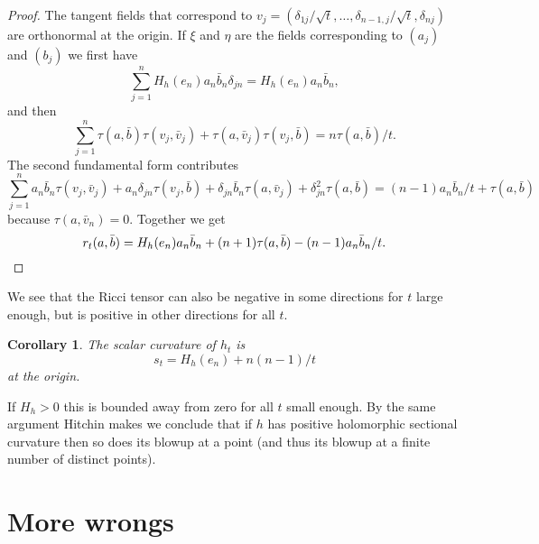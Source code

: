 \documentclass[10pt,a4paper]{amsart}
\newtheorem{coro}[theo]{Corollary}
\def\hsc{holomorphic sectional curvature}
\begin{document}
\begin{proof}
The tangent fields that correspond to
$v_j = (\delta_{1j}/\sqrt t, \ldots, \delta_{n-1,j}/\sqrt t, \delta_{nj})$ are
orthonormal at the origin.
If $\xi$ and $\eta$ are the fields corresponding to $(a_j)$ and $(b_j)$ we
first have
$$
\sum_{j=1}^n H_h(e_n) a_n \bar b_n \delta_{jn} = H_h(e_n) a_n \bar b_n,
$$
and then
$$
\sum_{j=1}^n
\tau(a, \bar b) \tau(v_j, \bar v_j) + \tau(a, \bar v_j) \tau(v_j, \bar b)
= n \tau(a, \bar b) / t.
$$
The second fundamental form contributes
$$
\sum_{j=1}^n
a_n \bar b_n \tau(v_j, \bar v_j)
+ a_n \delta_{jn} \tau(v_j, \bar b)
+ \delta_{jn} \bar b_n \tau(a, \bar v_j)
+ \delta_{jn}^2 \tau(a, \bar b)
= (n-1) a_n \bar b_n / t + \tau(a, \bar b)
$$
because $\tau(a, \bar v_n) = 0$.
Together we get
\[
r_t(a, \bar b)
= H_h(e_n) a_n \bar b_n
+ (n + 1) \tau(a, \bar b)
- (n-1) a_n \bar b_n / t.
\qedhere
\]
\end{proof}

We see that the Ricci tensor can also be negative in some directions for $t$
large enough, but is positive in other directions for all $t$.


\begin{coro}
The scalar curvature of $h_t$ is
$$
s_t
= H_h(e_n)
+ n(n-1) / t
$$
at the origin.
\end{coro}

If $H_h > 0$ this is bounded away from zero for all $t$ small enough.
By the same argument Hitchin makes we conclude that if $h$ has positive
\hsc{} then so does its blowup at a point (and thus its blowup at
a finite number of distinct points).




\section{More wrongs}
\end{document}
